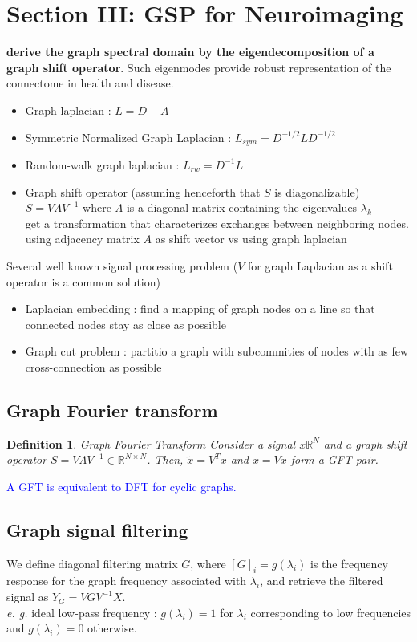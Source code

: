 \documentclass[12pt]{article}
\newcommand{\RR}{\mathbb{R}} %
\newcommand{\blue}[1]{\textcolor{blue}{#1}}
\newtheorem{definition}{Definition}
\begin{document}
\section{Section III: GSP for Neuroimaging}
\textbf{derive the graph spectral domain by the eigendecomposition of a graph shift operator}. 
Such eigenmodes provide robust representation of the connectome in health and disease.
\begin{itemize}
    \item Graph laplacian : $L = D - A$
    \item Symmetric Normalized Graph Laplacian : $L_{sym} = D^{-1/2}LD^{-1/2}$
    \item Random-walk graph laplacian : $L_{rw} = D^{-1}L$
    \item Graph shift operator (assuming henceforth that $S$ is diagonalizable) $S=V\Lambda V^{-1}$ where $\Lambda$ is a diagonal matrix containing the eigenvalues $\lambda_k$ \\
            get a transformation that characterizes exchanges between neighboring nodes.\\
            using adjacency matrix $A$ as shift vector vs using graph laplacian 
\end{itemize}
Several well known signal processing problem ($V$ for graph Laplacian as a shift operator is a common solution)
\begin{itemize}
    \item Laplacian embedding : find a mapping of graph nodes on a line so that connected nodes stay as close as possible
    \item Graph cut problem : partitio a graph with subcommities of nodes with as few cross-connection as possible
\end{itemize}

\subsection{Graph Fourier transform}
    \begin{definition}{Graph Fourier Transform}
        Consider a signal $x\RR^N$ and a graph shift operator $S=V\Lambda V^{-1}\in \RR^{N\times N}$. Then, $\tilde{x} = V^Tx$ and $x = V\tilde{x}$ form a GFT pair.
    \end{definition}
    \blue{A GFT is equivalent to DFT for cyclic graphs.}

\subsection{Graph signal filtering}
    We define diagonal filtering matrix $G$, where $[G]_i=g(\lambda_i)$ is the frequency response for the graph frequency associated with $\lambda_i$,
    and retrieve the filtered signal as $Y_G= VGV^{-1}X$.\\ 
    \textit{e. g.} ideal low-pass frequency : $g(\lambda_i)=1$ for $\lambda_i$ corresponding to low frequencies and $g(\lambda_i)=0$ otherwise. \\ 
\end{document}
